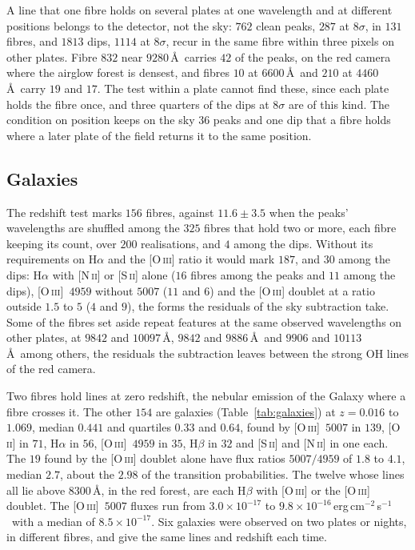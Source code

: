 \documentclass[3p,11pt]{elsarticle}
\newcommand{\flux}{erg\,cm$^{-2}$\,s$^{-1}$}
\begin{document}
A line that one fibre holds on several plates at one wavelength and at different
positions belongs to the detector, not the sky: $762$ clean peaks, $287$ at $8\sigma$, in
$131$ fibres, and $1813$ dips, $1114$ at $8\sigma$, recur in the same fibre within three
pixels on other plates. Fibre $832$ near $9280$\,\AA\ carries $42$ of the peaks, on the red
camera where the airglow forest is densest, and fibres $10$ at $6600$\,\AA\ and $210$ at
$4460$\,\AA\ carry $19$ and $17$. The test within a plate cannot find these, since each
plate holds the fibre once, and three quarters of the dips at $8\sigma$ are of this kind.
The condition on position keeps on the sky $36$ peaks and one dip that a fibre holds where
a later plate of the field returns it to the same position.

\subsection{Galaxies}

The redshift test marks $156$ fibres, against $11.6\pm3.5$ when the peaks' wavelengths
are shuffled among the $325$ fibres that hold two or more, each fibre keeping its count,
over $200$ realisations, and $4$ among the dips. Without its requirements on H$\alpha$
and the [O\,\textsc{iii}] ratio it would mark $187$, and $30$ among the dips: H$\alpha$
with [N\,\textsc{ii}] or [S\,\textsc{ii}] alone ($16$ fibres among the peaks and $11$
among the dips), [O\,\textsc{iii}]~$4959$ without $5007$ ($11$ and $6$) and the
[O\,\textsc{iii}] doublet at a ratio outside $1.5$ to $5$ ($4$ and $9$), the forms the
residuals of the sky subtraction take. Some of the fibres set aside repeat features at
the same observed wavelengths on other plates, at $9842$ and $10097$\,\AA, $9842$ and
$9886$\,\AA\ and $9906$ and $10113$\,\AA\ among others, the residuals the subtraction
leaves between the strong OH lines of the red camera.

Two fibres hold lines at zero redshift, the nebular emission of the Galaxy where a fibre
crosses it. The other $154$ are galaxies (Table~\ref{tab:galaxies}) at $z=0.016$ to
$1.069$, median $0.441$ and quartiles $0.33$ and $0.64$, found by
[O\,\textsc{iii}]~$5007$ in $139$, [O\,\textsc{ii}] in $71$, H$\alpha$ in $56$,
[O\,\textsc{iii}]~$4959$ in $35$, H$\beta$ in $32$ and [S\,\textsc{ii}] and
[N\,\textsc{ii}] in one each. The $19$ found by the [O\,\textsc{iii}] doublet alone have
flux ratios $5007/4959$ of $1.8$ to $4.1$, median $2.7$, about the $2.98$ of the
transition probabilities. The twelve whose lines all lie above $8300$\,\AA, in the red
forest, are each H$\beta$ with [O\,\textsc{iii}] or the [O\,\textsc{iii}] doublet. The
[O\,\textsc{iii}]~$5007$ fluxes run from $3.0\times10^{-17}$ to
$9.8\times10^{-16}$\,\flux\ with a median of $8.5\times10^{-17}$. Six galaxies were
observed on two plates or nights, in different fibres, and give the same lines and
redshift each time.
\end{document}
